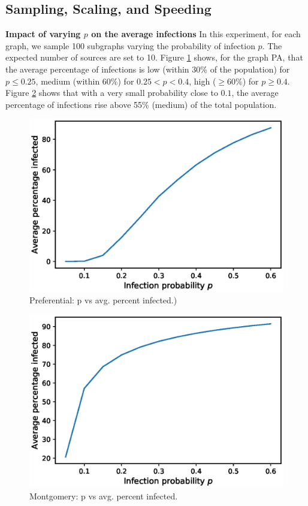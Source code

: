 \subsection{Sampling, Scaling, and Speeding}
\textbf{Impact of varying $p$ on the average infections}
In this experiment, for each graph, we sample 100 subgraphs varying the probability of infection $p$. The expected number of sources are set to 10. Figure \ref{fig:PA_ar} shows, for the graph PA, that the average percentage of infections is low (within 30\% of the population) for $p \leq 0.25$, medium (within 60\%) for $0.25 < p < 0.4$, high ($\geq 60\%$) for $p \geq 0.4$. Figure \ref{fig:montgo_ar} shows that with a very small probability close to $0.1$, the average percentage of infections rise above 55\% (medium) of the total population. 

\begin{figure}[!h]
    \centering
    \includegraphics[scale = 0.55]{Figuresnew/PA_attackrates.eps}
    \caption{Preferential: p vs avg. percent infected.)}
    \label{fig:PA_ar}
\end{figure}

\begin{figure}[!h]
    \centering
    \includegraphics[scale = 0.55]{Figuresnew/montgo_attackrates.eps}
    \caption{Montgomery: p vs avg. percent infected.}
    \label{fig:montgo_ar}
\end{figure}



